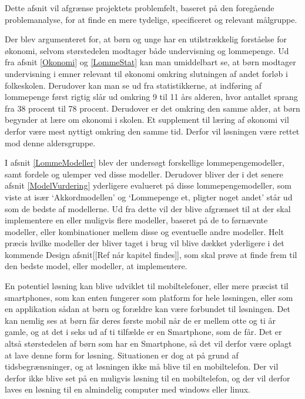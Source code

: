 Dette afsnit vil afgrænse projektets problemfelt, baseret på den foregående problemanalyse, for at finde en mere tydelige, specificeret og relevant målgruppe.

Der blev argumenteret for, at børn og unge har en utilstrækkelig forståelse for økonomi, selvom størstedelen modtager både undervisning og lommepenge. Ud fra afsnit \ref{Okonomi}  og \ref{LommeStat}  kan man umiddelbart se, at børn modtager undervisning i emner relevant til økonomi omkring slutningen af andet forløb i folkeskolen. Derudover kan man se ud fra statistikkerne, at indføring af lommepenge først rigtig slår ud omkring 9 til 11 års alderen, hvor antallet sprang fra 38 procent til 78 procent. Derudover er det omkring den samme alder, at børn begynder at lære om økonomi i skolen. Et supplement til læring af økonomi vil derfor være mest nyttigt omkring den samme tid. Derfor vil løsningen være rettet mod denne aldersgruppe.

I afsnit \ref{LommeModeller} blev der undersøgt forskellige lommepengemodeller, samt fordele og ulemper ved disse modeller. Derudover bliver der i det senere afsnit \ref{ModelVurdering} yderligere evalueret på disse lommepengemodeller, som viste at især ‘Akkordmodellen’ og ‘Lommepenge et, pligter noget andet’ står ud som de bedste af modellerne. Ud fra dette vil der blive afgrænset til at der skal implementere en eller muligvis flere modeller, baseret på de to førnævnte modeller, eller kombinationer mellem disse og eventuelle andre modeller. Helt præcis hvilke modeller der bliver taget i brug vil blive dækket yderligere i det kommende Design afsnit[[Ref når kapitel findes]], som skal prøve at finde frem til den bedste model, eller modeller, at implementere.

En potentiel løsning kan blive udviklet til mobiltelefoner, eller mere præcist til smartphones, som kan enten fungerer som platform for hele løsningen, eller som en applikation sådan at børn og forældre kan være forbundet til løsningen. Det kan nemlig ses at børn får deres første mobil når de er mellem otte og ti år gamle, og at det i seks ud af ti tilfælde er en Smartphone, som de får\cite{BornSmart}. Det er altså størstedelen af børn som har en Smartphone, så det vil derfor være oplagt at lave denne form for løsning. Situationen er dog at på grund af tidsbegrænsninger, og at løsningen ikke må blive til en mobiltelefon. Der vil derfor ikke blive set på en muligvis løsning til en mobiltelefon, og der vil derfor laves en løsning til en almindelig computer med windows eller linux.


